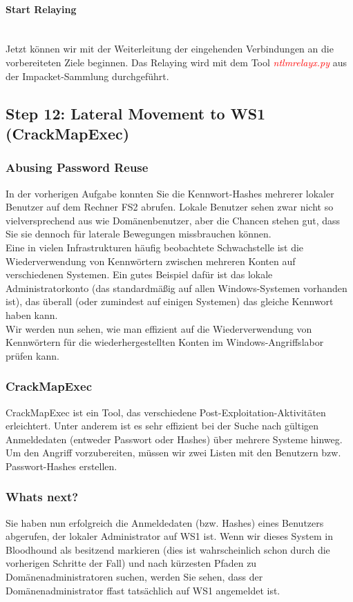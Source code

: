 \paragraph{Start Relaying}\mbox{} \\
Jetzt können wir mit der Weiterleitung der eingehenden Verbindungen an die vorbereiteten Ziele beginnen. Das Relaying wird mit dem Tool \textcolor{red}{\textit{ntlmrelayx.py}} aus der Impacket-Sammlung durchgeführt.

\subsection{Step 12: Lateral Movement to WS1 (CrackMapExec)}

\subsubsection{Abusing Password Reuse}
In der vorherigen Aufgabe konnten Sie die Kennwort-Hashes mehrerer lokaler Benutzer auf dem Rechner FS2 abrufen. Lokale Benutzer sehen zwar nicht so vielversprechend aus wie Domänenbenutzer, aber die Chancen stehen gut, dass Sie sie dennoch für laterale Bewegungen missbrauchen können.\\

Eine in vielen Infrastrukturen häufig beobachtete Schwachstelle ist die Wiederverwendung von Kennwörtern zwischen mehreren Konten auf verschiedenen Systemen. Ein gutes Beispiel dafür ist das lokale Administratorkonto (das standardmäßig auf allen Windows-Systemen vorhanden ist), das überall (oder zumindest auf einigen Systemen) das gleiche Kennwort haben kann.\\

Wir werden nun sehen, wie man effizient auf die Wiederverwendung von Kennwörtern für die wiederhergestellten Konten im Windows-Angriffslabor prüfen kann.

\subsubsection{CrackMapExec}
CrackMapExec ist ein Tool, das verschiedene Post-Exploitation-Aktivitäten erleichtert. Unter anderem ist es sehr effizient bei der Suche nach gültigen Anmeldedaten (entweder Passwort oder Hashes) über mehrere Systeme hinweg.\\
Um den Angriff vorzubereiten, müssen wir zwei Listen mit den Benutzern bzw. Passwort-Hashes erstellen.

\subsubsection{Whats next?}
Sie haben nun erfolgreich die Anmeldedaten (bzw. Hashes) eines Benutzers abgerufen, der lokaler Administrator auf WS1 ist. Wenn wir dieses System in Bloodhound als besitzend markieren (dies ist wahrscheinlich schon durch die vorherigen Schritte der Fall) und nach kürzesten Pfaden zu Domänenadministratoren suchen, werden Sie sehen, dass der Domänenadministrator ffast tatsächlich auf WS1 angemeldet ist.\\

